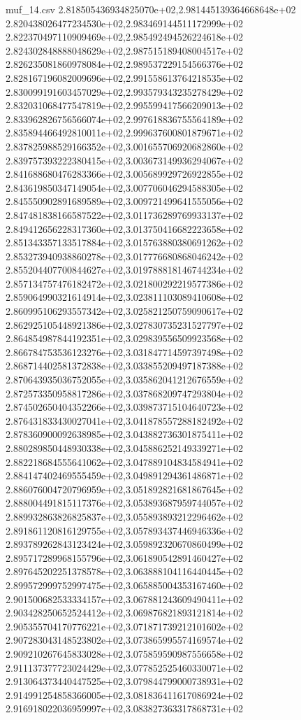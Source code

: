 \begin{filecontents*}{muf_14.csv}
2.818505436934825070e+02,2.981445139364668648e+02
2.820438026477234530e+02,2.983469144511172999e+02
2.822370497110909469e+02,2.985492494526224618e+02
2.824302848888048629e+02,2.987515189408004517e+02
2.826235081860978084e+02,2.989537229154566376e+02
2.828167196082009696e+02,2.991558613764218535e+02
2.830099191603457029e+02,2.993579343235278429e+02
2.832031068477547819e+02,2.995599417566209013e+02
2.833962826756566074e+02,2.997618836755564189e+02
2.835894466492810011e+02,2.999637600801879671e+02
2.837825988529166352e+02,3.001655706920682860e+02
2.839757393222380415e+02,3.003673149936294067e+02
2.841688680476283366e+02,3.005689929726922855e+02
2.843619850347149054e+02,3.007706046294588305e+02
2.845550902891689589e+02,3.009721499641555056e+02
2.847481838166587522e+02,3.011736289769933137e+02
2.849412656228317360e+02,3.013750416682223658e+02
2.851343357133517884e+02,3.015763880380691262e+02
2.853273940938860278e+02,3.017776680868046242e+02
2.855204407700844627e+02,3.019788818146744234e+02
2.857134757476182472e+02,3.021800292219577386e+02
2.859064990321614914e+02,3.023811103089410608e+02
2.860995106293557342e+02,3.025821250759090617e+02
2.862925105448921386e+02,3.027830735231527797e+02
2.864854987844192351e+02,3.029839556509923568e+02
2.866784753536123276e+02,3.031847714597397498e+02
2.868714402581372838e+02,3.033855209497187388e+02
2.870643935036752055e+02,3.035862041212676559e+02
2.872573350958817286e+02,3.037868209747293804e+02
2.874502650404352266e+02,3.039873715104640723e+02
2.876431833430027041e+02,3.041878557288182492e+02
2.878360900092638985e+02,3.043882736301875411e+02
2.880289850448930338e+02,3.045886252149339271e+02
2.882218684555641062e+02,3.047889104834584941e+02
2.884147402469555459e+02,3.049891294361486871e+02
2.886076004720796959e+02,3.051892821681867645e+02
2.888004491815117376e+02,3.053893687959744057e+02
2.889932863826825837e+02,3.055893893212296462e+02
2.891861120816129755e+02,3.057893437446946336e+02
2.893789262843123424e+02,3.059892320670860499e+02
2.895717289968155796e+02,3.061890542891460427e+02
2.897645202251378578e+02,3.063888104116440445e+02
2.899572999752997475e+02,3.065885004353167460e+02
2.901500682533334157e+02,3.067881243609490411e+02
2.903428250652524412e+02,3.069876821893121814e+02
2.905355704170776221e+02,3.071871739212101602e+02
2.907283043148523802e+02,3.073865995574169574e+02
2.909210267645833028e+02,3.075859590987556658e+02
2.911137377723024429e+02,3.077852525460330071e+02
2.913064373440447525e+02,3.079844799000738931e+02
2.914991254858366005e+02,3.081836411617086924e+02
2.916918022036959997e+02,3.083827363317868731e+02

\end{filecontents*}
